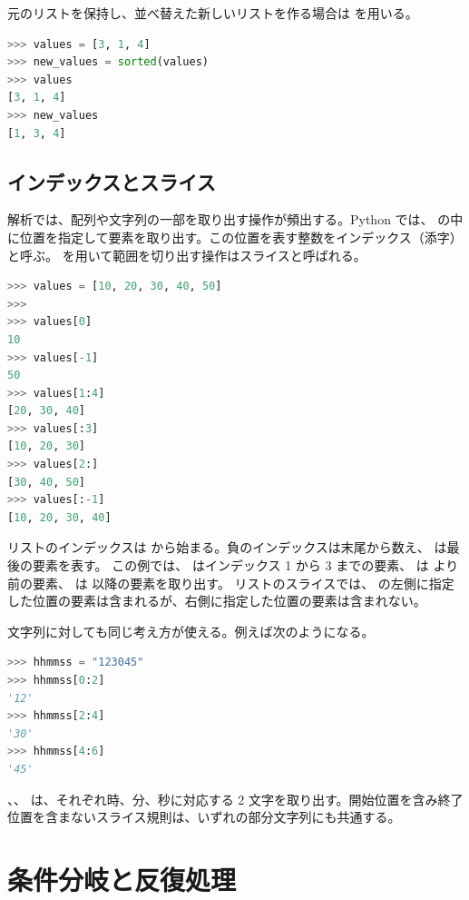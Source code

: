 元のリストを保持し、並べ替えた新しいリストを作る場合は  を用いる。
\begin{lstlisting}[language=Python, numbers=none, xleftmargin=2\zw]
>>> values = [3, 1, 4]
>>> new_values = sorted(values)
>>> values
[3, 1, 4]
>>> new_values
[1, 3, 4]
\end{lstlisting}

\subsection{インデックスとスライス}

解析では、配列や文字列の一部を取り出す操作が頻出する。Python では、\code{[]} の中に位置を指定して要素を取り出す。この位置を表す整数をインデックス（添字）と呼ぶ。\code{:} を用いて範囲を切り出す操作はスライスと呼ばれる。

\begin{lstlisting}[language=Python, numbers=none, xleftmargin=2\zw]
>>> values = [10, 20, 30, 40, 50]
>>>
>>> values[0]
10
>>> values[-1]
50
>>> values[1:4]
[20, 30, 40]
>>> values[:3]
[10, 20, 30]
>>> values[2:]
[30, 40, 50]
>>> values[:-1]
[10, 20, 30, 40]
\end{lstlisting}

リストのインデックスは  から始まる。負のインデックスは末尾から数え、 は最後の要素を表す。
この例では、 はインデックス 1 から 3 までの要素、 は  より前の要素、 は  以降の要素を取り出す。
リストのスライスでは、\code{:} の左側に指定した位置の要素は含まれるが、右側に指定した位置の要素は含まれない。

文字列に対しても同じ考え方が使える。例えば次のようになる。
\begin{lstlisting}[language=Python, numbers=none, xleftmargin=2\zw]
>>> hhmmss = "123045"
>>> hhmmss[0:2]
'12'
>>> hhmmss[2:4]
'30'
>>> hhmmss[4:6]
'45'
\end{lstlisting}

、、 は、それぞれ時、分、秒に対応する 2 文字を取り出す。開始位置を含み終了位置を含まないスライス規則は、いずれの部分文字列にも共通する。

\section{条件分岐と反復処理}

